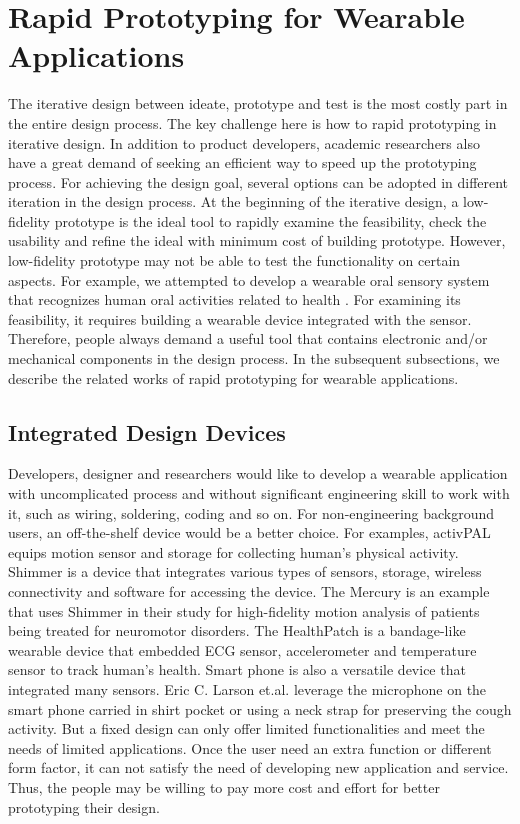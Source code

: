 \section{Rapid Prototyping for Wearable Applications}
The iterative design \cite{Nielsen:1993:IUD:618985.619982, tripp1990rapid, van2007design} between ideate, prototype and test is the most costly part in the entire design process.
The key challenge here is how to rapid prototyping in iterative design. In addition to product developers, academic researchers also have a great demand of seeking an efficient way to speed up the prototyping process. For achieving the design goal, several options can be adopted in different iteration in the design process. At the beginning of the iterative design, a low-fidelity prototype \cite{walker2002high} is the ideal tool to rapidly examine the feasibility, check the usability and refine the ideal with minimum cost of building prototype. However, low-fidelity prototype may not be able to test the functionality on certain aspects. For example, we attempted to develop a wearable oral sensory system that recognizes human oral activities related to health \cite{Li2013teeth}. For examining its feasibility, it requires building a wearable device integrated with the sensor. Therefore, people always demand a useful tool that contains electronic and/or mechanical components in the design process. In the subsequent subsections, we describe the related works of rapid prototyping for wearable applications.



\subsection{Integrated Design Devices}
Developers, designer and researchers would like to develop a wearable application with uncomplicated process and without significant engineering skill to work with it, such as wiring, soldering, coding and so on. For non-engineering background users, an off-the-shelf device would be a better choice. For examples, activPAL \cite{activPAL} equips motion sensor and storage for collecting human's physical activity. Shimmer \cite{Shimmer} is a device that integrates various types of sensors, storage, wireless connectivity and software for accessing the device. The Mercury \cite{Lorincz:2009:MWS:1644038.1644057} is an example that uses Shimmer in their study for high-fidelity motion analysis of patients being treated for neuromotor disorders. The HealthPatch \cite{vitalconnect} is a bandage-like wearable device that embedded ECG sensor, accelerometer and temperature sensor to track human's health.
Smart phone is also a versatile device that integrated many sensors. 
Eric C. Larson et.al. \cite{Larson:2011:APP:2030112.2030163} leverage the microphone on the smart phone carried in shirt pocket or using a neck strap for preserving the cough activity.
But a fixed design can only offer limited functionalities and meet the needs of limited applications. Once the user need an extra function or different form factor, it can not satisfy the need of developing new application and service. Thus, the people may be willing to pay more cost and effort for better prototyping their design.


